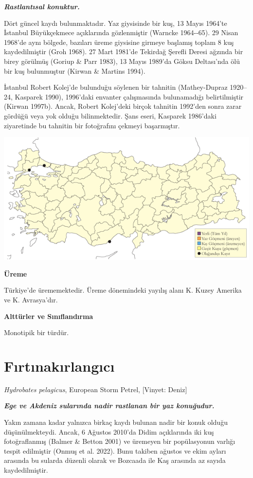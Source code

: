 \documentclass[
  letterpaper,
  DIV=11,
  numbers=noendperiod]{scrreprt}
\begin{document}
\textbf{\emph{Rastlantısal konuktur.}}

Dört güncel kaydı bulunmaktadır. Yaz giysisinde bir kuş, 13 Mayıs
1964'te İstanbul Büyükçekmece açıklarında gözlenmiştir (Warncke
1964-\/-65). 29 Nisan 1968'de aynı bölgede, bazıları üreme giysisine
girmeye başlamış toplam 8 kuş kaydedilmiştir (Groh 1968). 27 Mart
1981'de Tekirdağ Şerefli Deresi ağzında bir birey görülmüş (Goriup \&
Parr 1983), 13 Mayıs 1989'da Göksu Deltası'nda ölü bir kuş bulunmuştur
(Kirwan \& Martins 1994).

İstanbul Robert Kolej'de bulunduğu söylenen bir tahnitin (Mathey-Dupraz
1920--24, Kasparek 1990), 1996'daki envanter çalışmasında bulunamadığı
belirtilmiştir (Kirwan 1997b). Ancak, Robert Kolej'deki birçok tahnitin
1992'den sonra zarar gördüğü veya yok olduğu bilinmektedir. Şans eseri,
Kasparek 1986'daki ziyaretinde bu tahnitin bir fotoğrafını çekmeyi
başarmıştır.

\includegraphics{images/harita_Page_047.png}

\textbf{Üreme}

Türkiye'de ürememektedir. Üreme dönemindeki yayılış alanı K. Kuzey
Amerika ve K. Avrasya'dır.

\textbf{Alttürler ve Sınıflandırma}

Monotipik bir türdür.

\section{Fırtınakırlangıcı}\label{fux131rtux131nakux131rlangux131cux131}

\emph{Hydrobates pelagicus}, European Storm Petrel, {[}Vinyet: Deniz{]}

\textbf{\emph{Ege ve Akdeniz sularında nadir rastlanan bir yaz
konuğudur.}}

Yakın zamana kadar yalnızca birkaç kaydı bulunan nadir bir konuk olduğu
düşünülmekteydi. Ancak, 6 Ağustos 2010'da Didim açıklarında iki kuş
fotoğraflanmış (Balmer \& Betton 2001) ve üremeyen bir popülasyonun
varlığı tespit edilmiştir (Onmuş et al. 2022). Bunu takiben ağustos ve
ekim ayları arasında bu sularda düzenli olarak ve Bozcaada ile Kaş
arasında az sayıda kaydedilmiştir.
\end{document}
